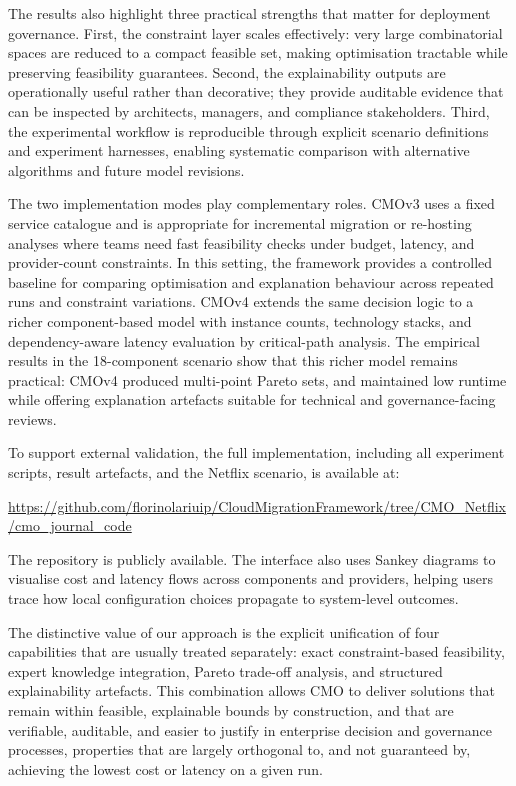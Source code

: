 \documentclass[journal]{IEEEtran}
\newcommand{\cmo}{CMO\xspace}
\newcommand{\cmothree}{CMOv3\xspace}
\newcommand{\cmofour}{CMOv4\xspace}
\begin{document}
The results also highlight three practical strengths that matter for deployment
governance. First, the constraint layer scales effectively: very large
combinatorial spaces are reduced to a compact feasible set, making optimisation
tractable while preserving feasibility guarantees. Second, the explainability
outputs are operationally useful rather than decorative; they provide auditable
evidence that can be inspected by architects, managers, and compliance
stakeholders. Third, the experimental workflow is reproducible through explicit
scenario definitions and experiment harnesses, enabling systematic comparison
with alternative algorithms and future model revisions.

The two implementation modes play complementary roles. \cmothree uses a fixed
service catalogue and is appropriate for incremental migration or re-hosting
analyses where teams need fast feasibility checks under budget, latency, and
provider-count constraints. In this setting, the framework provides a controlled
baseline for comparing optimisation and explanation behaviour across repeated
runs and constraint variations. \cmofour extends the same decision logic to a
richer component-based model with instance counts, technology stacks, and
dependency-aware latency evaluation by critical-path analysis. The empirical
results in the 18-component scenario show that this richer model remains
practical: \cmofour produced multi-point Pareto sets, and maintained low runtime
while offering explanation artefacts suitable for technical and governance-facing
reviews.

To support external validation, the full implementation, including all
experiment scripts, result artefacts, and the Netflix scenario, is available
at:
\begin{center}
\url{https://github.com/florinolariuip/CloudMigrationFramework/tree/CMO_Netflix/cmo_journal_code}
\end{center}
The repository is publicly available.
The interface also uses Sankey diagrams to visualise cost and latency flows
across components and providers, helping users trace how local configuration
choices propagate to system-level outcomes.

The distinctive value of our approach is the explicit unification of four
capabilities that are usually treated separately: exact constraint-based
feasibility, expert knowledge integration, Pareto trade-off analysis, and
structured explainability artefacts. This combination allows \cmo to deliver
solutions that remain within feasible, explainable bounds by construction,
and that are verifiable, auditable, and easier to justify in enterprise
decision and governance processes, properties that are largely orthogonal to,
and not guaranteed by, achieving the lowest cost or latency on a given run.
\end{document}
